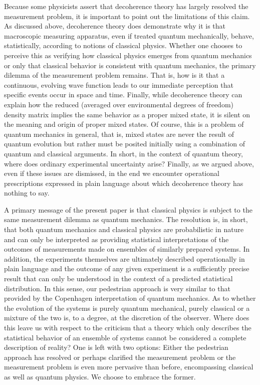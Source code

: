 \documentclass [12pt]{revtex4}
\begin{document}
Because some physicists assert that decoherence theory has largely
resolved the measurement problem, it is important to point out the
limitations of this claim. As discussed above, decoherence theory
does demonstrate why it is that macroscopic measuring apparatus,
even if treated quantum mechanically, behave, statistically,
according to notions of classical physics. Whether one chooses to
perceive this as verifying how classical physics {emerges}
from quantum mechanics or only that classical behavior is
{consistent} with quantum mechanics, the primary dilemma of
the measurement problem remains. That is, how is it that a
continuous, evolving wave function leads to our immediate perception
that specific events occur in space and time. Finally, while
decoherence theory can explain how the
reduced (averaged over environmental degrees of freedom) density
matrix implies the same behavior as a proper mixed state, it is
silent on the meaning and origin of proper mixed states. Of course,
this is a problem of quantum mechanics in general, that is, mixed
states are never the result of quantum evolution but rather must be
posited initially using a combination of quantum and classical
arguments. In short, in the context of quantum theory, where does
ordinary experimental uncertainty arise? Finally, as we argued
above, even if these issues are dismissed, in the end we encounter
operational prescriptions expressed in plain language about which
decoherence theory has nothing to say.

A primary message of the present paper is that classical physics is
subject to the same measurement dilemma as quantum mechanics. The
resolution is, in short, that both quantum mechanics and classical
physics are probabilistic in nature and can only be interpreted as
providing statistical interpretations of the outcomes of
measurements made on ensembles of similarly prepared systems. In
addition, the experiments themselves are ultimately described
operationally in plain language and the outcome of any given
experiment is a {sufficiently precise} result that can only
be understood in the context of a predicted statistical
distribution. In this sense, our pedestrian approach is
very similar to that provided by the Copenhagen interpretation of
quantum mechanics. As to whether the evolution of the systems is
purely quantum mechanical, purely classical or a mixture of the two
is, to a degree, at the discretion of the observer. Where does this
leave us with respect to the criticism that
a theory which only describes the statistical behavior of an
ensemble of systems cannot be considered a complete description of
reality? One is left with two options:
Either the pedestrian approach has resolved or perhaps clarified
the measurement problem or the measurement problem is even more pervasive
than before, encompassing classical as well as quantum physics. We choose
to embrace the former.
\end{document}
